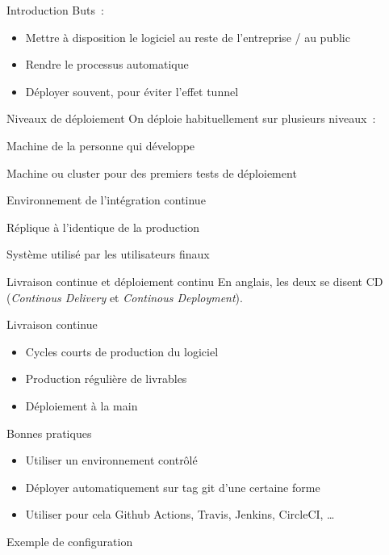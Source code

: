 \begin{frame}{Introduction}
  Buts~:
  \begin{itemize}[<+->]
    \item Mettre à disposition le logiciel au reste de l'entreprise / au public
    \item Rendre le processus automatique
    \item Déployer souvent, pour éviter l'effet tunnel
  \end{itemize}
\end{frame}

\begin{frame}{Niveaux de déploiement}
  On déploie habituellement sur plusieurs niveaux~:

  \begin{description}[<+->]
    \item[Local] Machine de la personne qui développe
    \item[Développement] Machine ou cluster pour des premiers tests de déploiement
    \item[Intégration] Environnement de l'intégration continue
    \item[Staging] Réplique à l'identique de la production
    \item[Production] Système utilisé par les utilisateurs finaux
  \end{description}
\end{frame}

\begin{frame}{Livraison continue et déploiement continu}
  En anglais, les deux se disent CD (\emph{Continous Delivery} et \emph{Continous Deployment}).

  \begin{block}{Livraison continue}
    \begin{itemize}[<+->]
      \item Cycles courts de production du logiciel
      \item Production régulière de livrables
      \item Déploiement à la main
    \end{itemize}
  \end{block}

\end{frame}

\begin{frame}{Bonnes pratiques}
  \begin{itemize}[<+->]
    \item Utiliser un environnement contrôlé
    \item Déployer automatiquement sur tag git d'une certaine forme
    \item Utiliser pour cela Github Actions, Travis, Jenkins, CircleCI, …
  \end{itemize}
\end{frame}

\begin{frame}{Exemple de configuration}
\end{frame}
